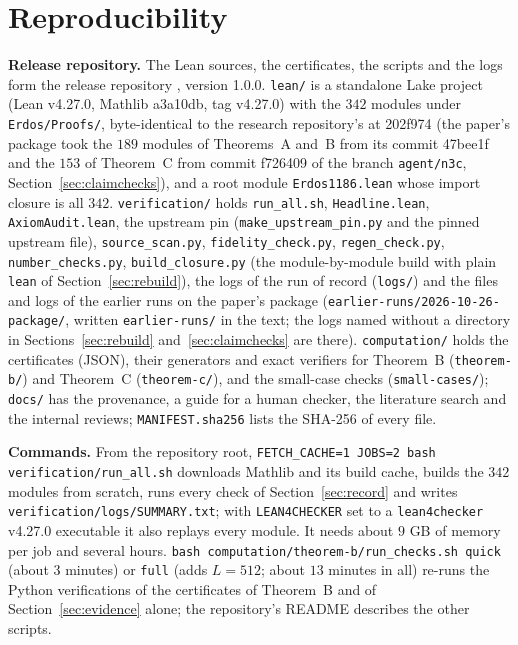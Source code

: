 \documentclass[11pt]{amsart}
\theoremstyle{remark}
\begin{document}
\appendix
\section{Reproducibility}\label{app:repro}
\textbf{Release repository.} The Lean sources, the certificates, the scripts and the logs form the release repository \cite{Artifact}, version 1.0.0.
\texttt{lean/} is a standalone Lake project (Lean v4.27.0, Mathlib a3a10db, tag v4.27.0) with the $342$ modules under \texttt{Erdos/Proofs/}, byte-identical to the research repository's at 202f974 (the paper's package took the $189$ modules of Theorems~A and~B from its commit 47bee1f and the $153$ of Theorem~C from commit f726409 of the branch \texttt{agent/n3c}, Section~\ref{sec:claimchecks}), and a root module \texttt{Erdos1186.lean} whose import closure is all $342$.
\texttt{verification/} holds \texttt{run\_all.sh}, \texttt{Headline.lean}, \texttt{AxiomAudit.lean}, the upstream pin (\texttt{make\_upstream\_pin.py} and the pinned upstream file), \texttt{source\_scan.py}, \texttt{fidelity\_check.py}, \texttt{regen\_check.py}, \texttt{number\_checks.py}, \texttt{build\_closure.py} (the module-by-module build with plain \texttt{lean} of Section~\ref{sec:rebuild}), the logs of the run of record (\texttt{logs/}) and the files and logs of the earlier runs on the paper's package (\texttt{earlier-runs/2026-10-26-package/}, written \texttt{earlier-runs/} in the text; the logs named without a directory in Sections~\ref{sec:rebuild} and~\ref{sec:claimchecks} are there).
\texttt{computation/} holds the certificates (JSON), their generators and exact verifiers for Theorem~B (\texttt{theorem-b/}) and Theorem~C (\texttt{theorem-c/}), and the small-case checks (\texttt{small-cases/}); \texttt{docs/} has the provenance, a guide for a human checker, the literature search and the internal reviews; \texttt{MANIFEST.sha256} lists the SHA-256 of every file.

\textbf{Commands.} From the repository root, \texttt{FETCH\_CACHE=1 JOBS=2 bash verification/run\_all.sh} downloads Mathlib and its build cache, builds the $342$ modules from scratch, runs every check of Section~\ref{sec:record} and writes \texttt{verification/logs/SUMMARY.txt}; with \texttt{LEAN4CHECKER} set to a \texttt{lean4checker} v4.27.0 executable it also replays every module. It needs about $9$ GB of memory per job and several hours. \texttt{bash computation/theorem-b/run\_checks.sh quick} (about $3$ minutes) or \texttt{full} (adds $L=512$; about $13$ minutes in all) re-runs the Python verifications of the certificates of Theorem~B and of Section~\ref{sec:evidence} alone; the repository's README describes the other scripts.
\end{document}
